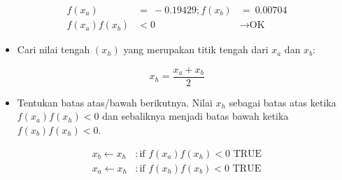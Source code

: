 \documentclass[10pt, a4paper]{article}
\providecommand{\tightlist}{%
      \setlength{\itemsep}{0pt}\setlength{\parskip}{0pt}}
\begin{document}
\[\begin{aligned} f(x_a) &=\ -0.19429 ; f(x_b) &=\ 0.00704 \\
f(x_a)f(x_b) &< 0 &\rightarrow \text{OK} \end{aligned}\]

\begin{itemize}
\tightlist
\item
  Cari nilai tengah \((x_h)\) yang merupakan titik tengah dari \(x_a\)
  dan \(x_b\):
\end{itemize}

\[x_h = \frac{x_a + x_b}{2}\]

\begin{itemize}
\tightlist
\item
  Tentukan batas atas/bawah berikutnya. Nilai \(x_h\) sebagai batas atas
  ketika \(f(x_a)f(x_h)<0\) dan sebaliknya menjadi batas bawah ketika
  \(f(x_b)f(x_h)<0\).
\end{itemize}

\[\begin{aligned} x_b \leftarrow x_h &: \text{if } f(x_a)f(x_h)<0 \text{ TRUE} \\
x_a \leftarrow x_h &: \text{if } f(x_h)f(x_b)<0 \text{ TRUE}
\end{aligned}\]
\end{document}
